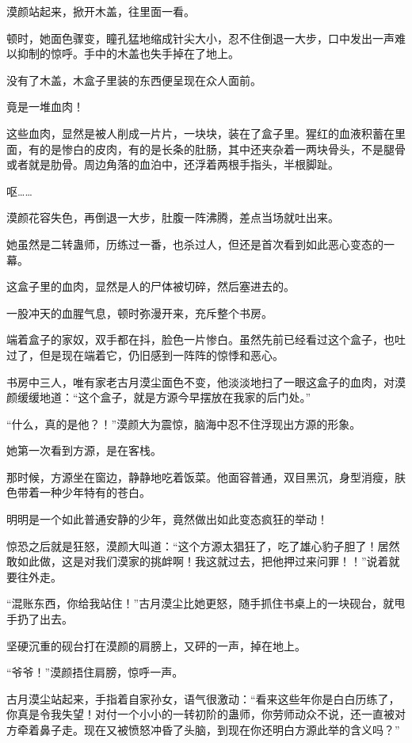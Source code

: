 \begin{this_body}
漠颜站起来，掀开木盖，往里面一看。

顿时，她面色骤变，瞳孔猛地缩成针尖大小，忍不住倒退一大步，口中发出一声难以抑制的惊呼。手中的木盖也失手掉在了地上。

没有了木盖，木盒子里装的东西便呈现在众人面前。

竟是一堆血肉！

这些血肉，显然是被人削成一片片，一块块，装在了盒子里。猩红的血液积蓄在里面，有的是惨白的皮肉，有的是长条的肚肠，其中还夹杂着一两块骨头，不是腿骨或者就是肋骨。周边角落的血泊中，还浮着两根手指头，半根脚趾。

呕……

漠颜花容失色，再倒退一大步，肚腹一阵沸腾，差点当场就吐出来。

她虽然是二转蛊师，历练过一番，也杀过人，但还是首次看到如此恶心变态的一幕。

这盒子里的血肉，显然是人的尸体被切碎，然后塞进去的。

一股冲天的血腥气息，顿时弥漫开来，充斥整个书房。

端着盒子的家奴，双手都在抖，脸色一片惨白。虽然先前已经看过这个盒子，也吐过了，但是现在端着它，仍旧感到一阵阵的惊悸和恶心。

书房中三人，唯有家老古月漠尘面色不变，他淡淡地扫了一眼这盒子的血肉，对漠颜缓缓地道：“这个盒子，就是方源今早摆放在我家的后门处。”

“什么，真的是他？！”漠颜大为震惊，脑海中忍不住浮现出方源的形象。

她第一次看到方源，是在客栈。

那时候，方源坐在窗边，静静地吃着饭菜。他面容普通，双目黑沉，身型消瘦，肤色带着一种少年特有的苍白。

明明是一个如此普通安静的少年，竟然做出如此变态疯狂的举动！

惊恐之后就是狂怒，漠颜大叫道：“这个方源太猖狂了，吃了雄心豹子胆了！居然敢如此做，这是对我们漠家的挑衅啊！我这就过去，把他押过来问罪！！”说着就要往外走。

“混账东西，你给我站住！”古月漠尘比她更怒，随手抓住书桌上的一块砚台，就甩手扔了出去。

坚硬沉重的砚台打在漠颜的肩膀上，又砰的一声，掉在地上。

“爷爷！”漠颜捂住肩膀，惊呼一声。

古月漠尘站起来，手指着自家孙女，语气很激动：“看来这些年你是白白历练了，你真是令我失望！对付一个小小的一转初阶的蛊师，你劳师动众不说，还一直被对方牵着鼻子走。现在又被愤怒冲昏了头脑，到现在你还明白方源此举的含义吗？”


\end{this_body}
